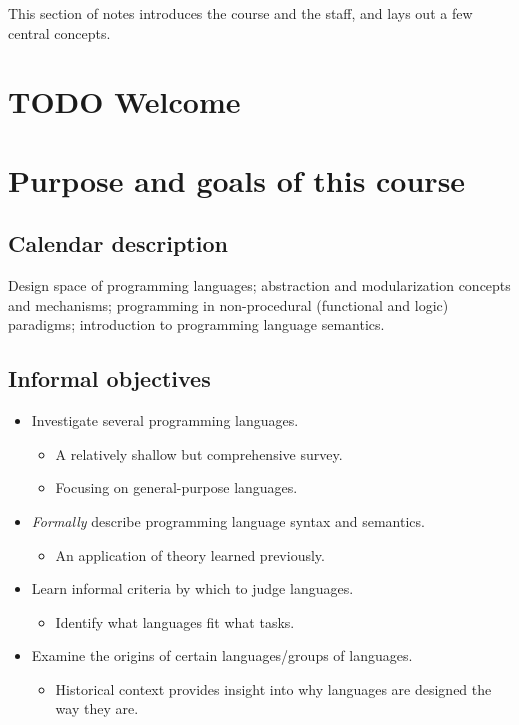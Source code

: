 \documentclass[11pt]{article}
\theoremstyle{definition}
\begin{document}
This section of notes introduces the course and the staff,
and lays out a few central concepts.

\section{{\bfseries\sffamily TODO} Welcome}
\label{sec:orga8578a2}
\section{Purpose and goals of this course}
\label{sec:orgf5b5da8}

\subsection{Calendar description}
\label{sec:org5414889}

Design space of programming languages;
abstraction and modularization concepts and mechanisms;
programming in non-procedural (functional and logic) paradigms;
introduction to programming language semantics.

\subsection{Informal objectives}
\label{sec:org10667aa}

\begin{itemize}
\item Investigate several programming languages.
\begin{itemize}
\item A relatively shallow but comprehensive survey.
\item Focusing on general-purpose languages.
\end{itemize}
\item \emph{Formally} describe programming language syntax and semantics.
\begin{itemize}
\item An application of theory learned previously.
\end{itemize}
\item Learn informal criteria by which to judge languages.
\begin{itemize}
\item Identify what languages fit what tasks.
\end{itemize}
\item Examine the origins of certain languages/groups of languages.
\begin{itemize}
\item Historical context provides insight into why languages
are designed the way they are.
\end{itemize}
\end{itemize}
\end{document}

